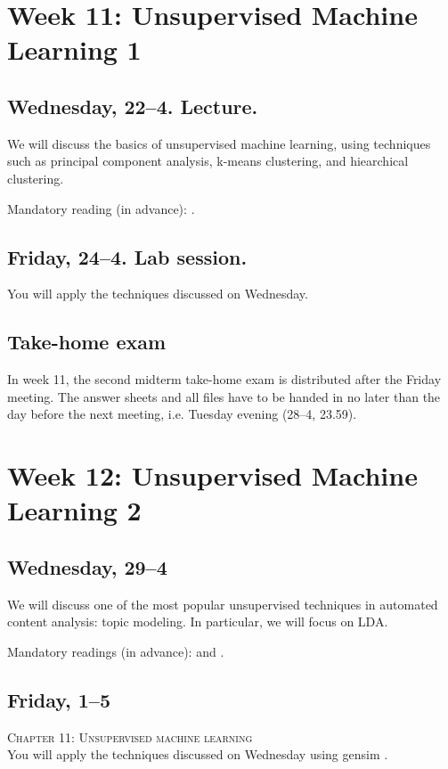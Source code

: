 \section*{Week 11: Unsupervised Machine Learning 1}

\subsection*{Wednesday, 22--4. Lecture.}
We will discuss the basics of unsupervised machine learning, using techniques such as principal component analysis, k-means clustering, and hiearchical clustering.

Mandatory reading (in advance): \cite{burscher2016}.

\subsection*{Friday, 24--4. Lab session.}
You will apply the techniques discussed on Wednesday.


\subsection*{Take-home exam}
In week 11, the second midterm take-home exam is distributed after the Friday meeting. The answer sheets and all files have to be handed in no later than the day before the next meeting, i.e. Tuesday evening (28--4, 23.59).




\section*{Week 12: Unsupervised Machine Learning 2}


\subsection*{Wednesday, 29--4}
We will discuss one of the most popular unsupervised techniques in automated content analysis: topic modeling. In particular, we will focus on LDA.

Mandatory readings (in advance): \cite{Maier2018a} and \cite{Tsur2015}. 

\subsection*{Friday, 1--5}
\textsc{ Chapter 11: Unsupervised machine learning}\\
You will apply the techniques discussed on Wednesday using gensim \citep{Rehurek2010}.




